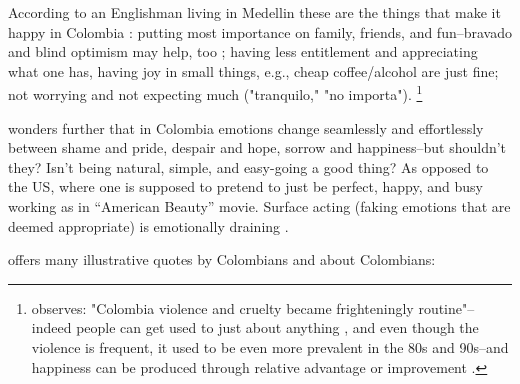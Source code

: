 \documentclass[10pt, letterpaper]{article}
\begin{document}
\begin{spacing}{2}
According to an Englishman living in Medellin these are the things that make it
happy in Colombia \citep{bargentWP16jan15}: putting most importance on family, friends,  {and fun}--bravado and blind optimism may help, too%
; having less entitlement and appreciating what one has, having joy in small things,
e.g., cheap coffee/alcohol are just fine; not worrying and not expecting much
("tranquilo," "no importa").%
\footnote{\citet{bargentWP16jan15} observes: "Colombia violence and
cruelty became frighteningly routine"--indeed people can get used to just about
anything \citep{brickman78cj}, and even though the violence is frequent, it
used to be even more prevalent in the 80s and 90s--and happiness can be produced through relative
advantage or improvement \citep{michalos85}.} %

\citet{bargentWP16jan15} wonders further that in Colombia emotions change seamlessly and
effortlessly between shame and pride, despair and hope, sorrow and
happiness--but shouldn't they? Isn't being natural, simple, and easy-going a good thing?  
As opposed to the US, where one is supposed to pretend to just be perfect,
happy, and busy working as in ``American Beauty'' movie. {Surface acting
  (faking emotions that are deemed appropriate) is emotionally draining
  \citep{brooksATL22nov17}.} 


\citet{wallaceBBC17mar30} offers many illustrative quotes by Colombians and
about Colombians:


\end{spacing}
\end{document}

